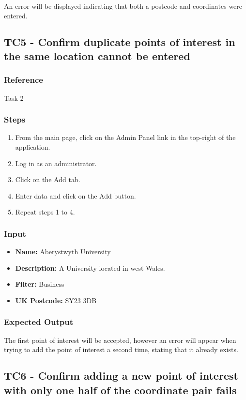 An error will be displayed indicating that both a postcode and coordinates were entered.

\subsection{TC5 - Confirm duplicate points of interest in the same location cannot be entered}

\subsubsection{Reference}

Task 2

\subsubsection{Steps}

\begin{enumerate}
		\item From the main page, click on the Admin Panel link in the top-right of the application.
	\item Log in as an administrator.
	\item Click on the Add tab.
	\item Enter data and click on the Add button.
	\item Repeat steps 1 to 4.
\end{enumerate}	
\subsubsection{Input}
\begin{itemize}
	\item \textbf{Name: } Aberystwyth University
	\item \textbf{Description: } A University located in west Wales.
	\item \textbf{Filter: } Business
	\item \textbf{UK Postcode: } SY23 3DB
\end{itemize}
\subsubsection{Expected Output}
The first point of interest will be accepted, however an error will appear when trying to add the point of interest a second time, stating that it already exists.
\subsection{TC6 - Confirm adding a new point of interest with only one half of the coordinate pair fails}


